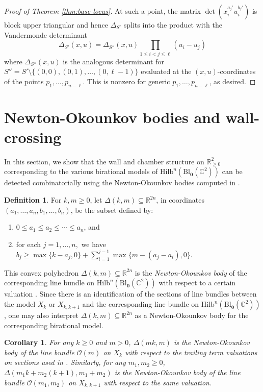 \documentclass[12pt]{amsart}
\newcommand{\Hilb}{\mathrm{Hilb}}
\newcommand{\C}{\mathbb{C}}
\newcommand{\R}{\mathbb{R}}
\newcommand{\CO}{\mathcal{O}}
\newcommand{\Bl}{\mathrm{Bl}}
\numberwithin{equation}{section}
\newtheorem{corollary}[theorem]{Corollary}
\theoremstyle{definition}
\newtheorem{definition}[theorem]{Definition}
\begin{document}
\begin{proof}[Proof of Theorem \ref{thm:base locus}]
    At such a point, the matrix $\det\left(x_i^{a_j'}u_i^{b_j'}\right)$ is block upper triangular and hence $\Delta_{S'}$ splits into the product with the Vandermonde determinant
    \[ \Delta_{S'}(x,u) = \Delta_{S''}(x,u) \prod_{1\leq i < j \leq \ell} (u_i-u_j) \]
    where $\Delta_{S''}(x,u)$ is the analogous determinant for $S'' = S' \setminus \{(0,0),(0,1),\dots,(0,\ell-1) \}$ evaluated at the $(x,u)$-coordinates of the points $p_1,\dots,p_{n-\ell}$. This is nonzero for generic $p_1,\dots,p_{n-\ell}$, as desired.
\end{proof}



\section{Newton-Okounkov bodies and wall-crossing }\label{sec:NObodies}

In this section, we show that the wall and chamber structure on $\R^2_{\geq 0}$ corresponding to the various birational models of $\Hilb^n(\Bl_{\mathbf{0}}(\C^2))$ can be detected combinatorially using the Newton-Okounkov bodies computed in \cite{CGOT}. 

\begin{definition}\label{def:Delta(m,k)}
    For $k,m\geq 0$, let $\Delta(k,m)\subseteq\R^{2n}$, in coordinates $(a_1,\dots,a_n,b_1,\dots,b_n)$, be the subset defined by:
    \begin{enumerate}
        \item $0\leq a_1\leq a_2 \leq \cdots \leq a_n$, and
        \item for each $j=1,\dots,n,$ we have $b_j\geq \max\{k-a_j,0\} + \sum_{i=1}^{j-1}\max\{m-(a_j-a_i),0\}.$
    \end{enumerate}
\end{definition}

This convex polyhedron $\Delta(k,m)\subseteq \R^{2n}$ is the \textit{Newton-Okounkov body} of the corresponding line bundle on $\Hilb^n(\Bl_{\mathbf{0}}(\C^2))$ with respect to a certain valuation \cite{CGOT}. Since there is an identification of the sections of line bundles between the model $X_k$ or $X_{k,k+1}$ and the corresponding line bundle on $\Hilb^n(\Bl_{\mathbf{0}}(\C^2))$, one may also interpret $\Delta(k,m)\subseteq \R^{2n}$ as a Newton-Okounkov body for the corresponding birational model.

\begin{corollary}
    For any $k\geq 0$ and $m>0$, $\Delta(mk,m)$ is the Newton-Okounkov body of the line bundle $\CO(m)$ on $X_k$ with respect to the trailing term valuations on sections used in \cite{CGOT}. Similarly, for any $m_1,m_2\geq 0$, $\Delta(m_1k+m_2(k+1),m_1+m_2)$ is the Newton-Okounkov body of the line bundle $\CO(m_1,m_2)$ on $X_{k,k+1}$ with respect to the same valuation.
\end{corollary}
\end{document}

